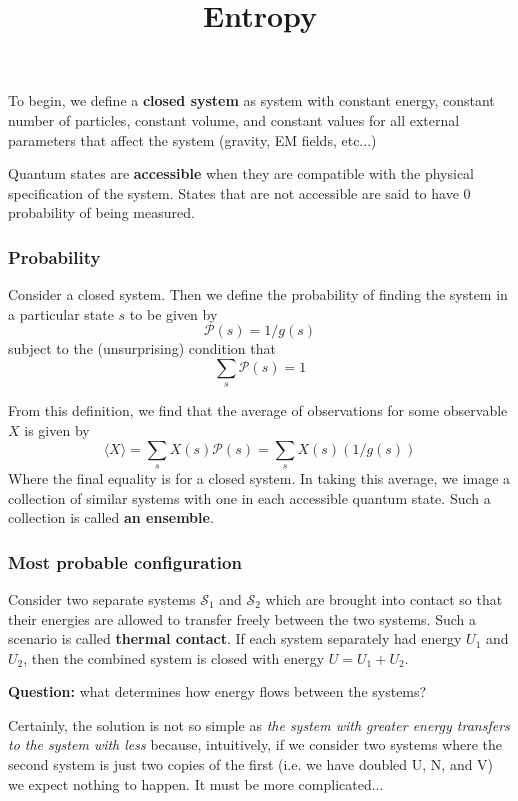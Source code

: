 \documentclass{article}
\title{Entropy}
\newcommand{\prob}{\mathcal{P}}
\begin{document}
\maketitle
To begin, we define a \textbf{closed system} as system with constant energy,
constant number of particles, constant volume, and constant values for all
external parameters that affect the system (gravity, EM fields, etc...)

Quantum states are \textbf{accessible} when they are compatible with the
physical specification of the system. States that are not accessible are said to
have $0$ probability of being measured.

\subsubsection*{Probability}
Consider a closed system. Then we define the probability of finding the system
in a particular state $s$ to be given by
\begin{equation}
  \prob(s) = 1/g(s) 
\end{equation}
subject to the (unsurprising) condition that
\begin{equation}
  \sum_s \prob(s) = 1
\end{equation}

From this definition, we find that the average of observations for some
observable $X$ is given by
\begin{equation}
  \langle  X \rangle = \sum_s X(s)\prob(s) = \sum_s X(s)(1/g(s))
\end{equation}
Where the final equality is for a closed system. In taking this average, we
image a collection of similar systems with one in each accessible quantum state.
Such a collection is called \textbf{an ensemble}.


\subsubsection*{Most probable configuration}
Consider two separate systems $\mathcal{S}_1$ and $\mathcal{S}_2$ which are
brought into contact so that their energies are allowed to transfer freely
between the two systems. Such a scenario is called \textbf{thermal contact}. If
each system separately had energy $U_1$ and $U_2$, then the combined system is
closed with energy $U=U_1+U_2$.

\textbf{Question:} what determines how energy flows between the systems? 

Certainly, the solution is not so simple as \textit{the system with greater
  energy transfers to the system with less} because, intuitively, if we consider
two systems where the second system is just two copies of the first (i.e. we
have doubled U, N, and V) we expect nothing to happen. It must be more
complicated...
\end{document}
